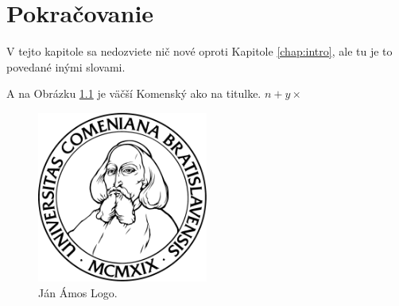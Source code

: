 \chapter{Pokračovanie}\label{chap:dalej}

V tejto kapitole sa nedozviete nič nové oproti Kapitole \ref{chap:intro},
ale tu je to povedané inými slovami.

A na Obrázku \ref{img:komensky} je väčší Komenský ako na titulke.
$n+y\times$

\begin{figure}[!hbt]
\begin{center}
\includegraphics[width=0.5\textwidth]{komlogo-new}

\caption{Ján Ámos Logo.}
\label{img:komensky}
\end{center}
\end{figure}

